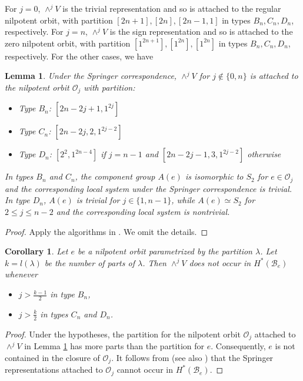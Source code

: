 \documentclass[10pt]{amsart}
\newcommand{\orbit}{\mathcal O}
\newcommand{\flag}{{\mathcal B}}
\theoremstyle{plain}
\newtheorem{lemma}[theorem]{Lemma}
\newtheorem{corollary}[theorem]{Corollary}
\theoremstyle{definition}
\theoremstyle{remark}
\begin{document}
For $j = 0$, $\wedge^j V$ is the trivial representation and so is attached to the regular nilpotent orbit,
with partition $[2n+1], [2n], [2n-1, 1]$ in types $B_n, C_n, D_n$, respectively.
For $j =  n$, $\wedge^j V$ is the sign representation and so is attached to the zero nilpotent orbit,
with partition $[1^{2n+1}], [1^{2n}], [1^{2n}]$ in types $B_n, C_n, D_n$, respectively.
For the other cases, we have

\begin{lemma} \label{springer:wedgie}
Under the Springer correspondence, $\wedge^j V$ for $j \not\in \{ 0, n \}$
is attached to the nilpotent orbit $\orbit_j$ with partition:
\begin{itemize} 
\item Type $B_n$:  $[2n -2j + 1, 1^{2j}]$
\item Type $C_n$:  $[2n -2j, 2, 1^{2j -2}]$
\item Type $D_n$:  $[2^{2}, 1^{2n-4}]$ if $j=n-1$ and $[2n -2j-1, 3, 1^{2j -2}]$ otherwise
\end{itemize} 
In types $B_n$ and $C_n$, the component group $A(e)$ is isomorphic to $S_2$ for $e \in \orbit_j$
and the corresponding local system under the Springer correspondence is trivial.
In type $D_n$, $A(e)$ is trivial for $j \in \{1,n-1\}$, while $A(e) \simeq S_2$ for $2  \leq  j \leq n-2$ and the corresponding local system is nontrivial.
\end{lemma}

\begin{proof}
Apply the algorithms in \cite[Chapter 13.3]{carter:book}.   We omit the details.  %
\end{proof}

\begin{corollary} \label{cor:springer:wedgie}
Let $e$ be a nilpotent orbit parametrized by the partition $\lambda$.  Let $k = l(\lambda)$ be the number of parts of $\lambda$.
Then $\wedge^j V$ does not occur in $H^*(\flag_e)$ whenever
\begin{itemize} 
\item $j > \frac{k-1}{2}$ in type $B_n$,
\item $j > \frac{k}{2}$ in types $C_n$ and $D_n$.
\end{itemize} 
\end{corollary}

\begin{proof}
Under the hypotheses, the partition for the 
 nilpotent orbit $\orbit_j$ attached to $\wedge^j V$ in Lemma \ref{springer:wedgie} has more parts than the partition for $e$.  Consequently,
 $e$ is not contained in the closure of $\orbit_j$.  It follows from \cite[Corollary 2]{borho-mac} (see also \cite[Theorem 4.4]{shoji:green_classical}) that the Springer representations attached to 
 $\orbit_j$ cannot occur in $H^*(\flag_e)$. 
\end{proof}
\end{document}
